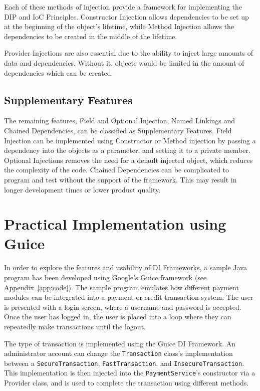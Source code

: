 \documentclass[12pt,twocolumn]{IEEEtran}
\begin{document}
Each of these methods of injection provide a framework for implementing the DIP and IoC Principles. Constructor Injection allows dependencies to be set up at the beginning of the object's lifetime, while Method Injection allows the dependencies to be created in the middle of the lifetime. 

Provider Injections are also essential due to the ability to inject large amounts of data and dependencies. Without it, objects would be limited in the amount of dependencies which can be created. 

\subsection{Supplementary Features}

The remaining features, Field and Optional Injection, Named Linkings and Chained Dependencies, can be classified as Supplementary Features. Field Injection can be implemented using Constructor or Method injection by passing a dependency into the objects as a parameter, and setting it to a private member. Optional Injections removes the need for a default injected object, which reduces the complexity of the code. Chained Dependencies can be complicated to program and test without the support of the framework. This may result in longer development times or lower product quality.

\section{Practical Implementation using Guice}

In order to explore the features and usability of DI Frameworks, a sample Java program has been developed using Google's Guice framework (see Appendix~\ref{app:code}). %
The sample program emulates how different payment modules can be integrated into a payment or credit transaction system. The user is presented with a login screen, where a username and password is accepted. Once the user has logged in, the user is placed into a loop where they can repeatedly make transactions until the logout. 

The type of transaction is implemented using the Guice DI Framework. An administrator account can change the \verb|Transaction| class's implementation between a \verb|SecureTransaction|, \verb|FastTransaction|, and \verb|InsecureTransaction|. This implementation is then injected into the \verb|PaymentService|'s constructor via a Provider class, and is used to complete the transaction using different methods. 
\end{document}
